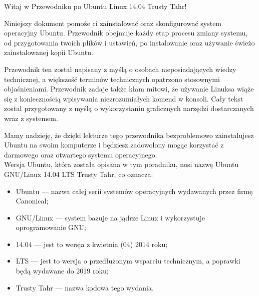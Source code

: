 \noindent Witaj w \textcolor{ubuntu_orange}{Przewodniku po Ubuntu Linux 14.04 Trusty Tahr!}

Niniejszy dokument pomoże ci zainstalować oraz skonfigurować system operacyjny Ubuntu. Przewodnik obejmuje każdy etap procesu zmiany systemu, od przygotowania twoich plików i ustawień, po instalowanie oraz używanie świeżo zainstalowanej kopii Ubuntu.

Przewodnik ten został napisany z myślą o osobach nieposiadających wiedzy technicznej, a większość terminów technicznych opatrzono stosownymi objaśnieniami. Przewodnik zadaje także kłam mitowi, że używanie Linuksa wiąże się z koniecznością wpisywania niezrozumiałych komend w konsoli. Cały tekst został przygotowany z myślą o wykorzystaniu graficznych narzędzi dostarczanych wraz z systemem.

Mamy nadzieję, że dzięki lekturze tego przewodnika bezproblemowo zainstalujesz Ubuntu na swoim komputerze i będziesz zadowolony mogąc korzystać z darmowego oraz otwartego systemu operacyjnego.\\
Wersja Ubuntu, która została opisana w tym poradniku, nosi nazwę Ubuntu GNU/Linux 14.04 LTS Trusty Tahr, co oznacza:
\begin{itemize}
\item \textcolor{ubuntu_orange}{Ubuntu} ---  nazwa całej serii systemów operacyjnych wydawanych przez firmę Canonical;
\item \textcolor{ubuntu_orange}{GNU/Linux} --- system bazuje na jądrze Linux i wykorzystuje oprogramowanie GNU;
\item \textcolor{ubuntu_orange}{14.04} --- jest to wersja z kwietnia (04) 2014 roku;
\item \textcolor{ubuntu_orange}{LTS} --- jest to wersja o przedłużonym wsparciu technicznym, a poprawki będą wydawane do 2019 roku;
\item \textcolor{ubuntu_orange}{Trusty Tahr} --- nazwa kodowa tego wydania.
\end{itemize}
